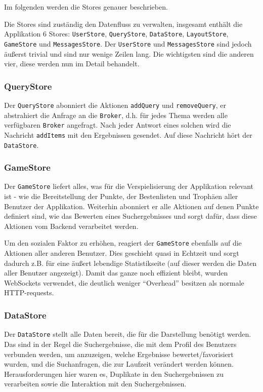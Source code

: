 \documentclass[12pt,twoside]{book}
\begin{document}
Im folgenden werden die Stores genauer beschrieben.

Die Stores sind zuständig den Datenfluss zu verwalten, insgesamt enthält die Applikation 6 Stores: \texttt{UserStore}, \texttt{QueryStore}, \texttt{DataStore}, \texttt{LayoutStore}, \texttt{GameStore} und \texttt{MessagesStore}.
Der \texttt{UserStore} und \texttt{MessagesStore} sind jedoch äußerst trivial und sind nur wenige Zeilen lang. Die wichtigsten sind die anderen vier, diese werden nun im Detail behandelt.

\subsubsection*{QueryStore}

Der \texttt{QueryStore} abonniert die Aktionen \texttt{addQuery} und \texttt{removeQuery}, er abstrahiert die Anfrage an die \texttt{Broker}, d.h. für jedes Thema werden alle verfügbaren \texttt{Broker} angefragt. Nach jeder Antwort eines solchen wird die Nachricht \texttt{addItems} mit den Ergebnissen gesendet. Auf diese Nachricht hört der \texttt{DataStore}.

\subsubsection*{GameStore}

Der \texttt{GameStore} liefert alles, was für die Verspielisierung der Applikation relevant ist - wie die Bereitstellung der Punkte, der Bestenlisten und Trophäen aller Benutzer der Applikation. Weiterhin abonniert er alle Aktionen auf denen Punkte definiert sind, wie das Bewerten eines Suchergebnisses und sorgt dafür, dass diese Aktionen vom Backend verarbeitet werden.

Um den sozialen Faktor zu erhöhen, reagiert der \texttt{GameStore} ebenfalls auf die Aktionen aller anderen Benutzer. Dies geschieht quasi in Echtzeit und sorgt dadurch z.B. für eine äußert lebendige Statistikseite (auf dieser werden die Daten aller Benutzer angezeigt).
Damit das ganze noch effizient bleibt, wurden WebSockets verwendet, die deutlich weniger ``Overhead'' besitzen als normale HTTP-requests.

\subsubsection*{DataStore}

Der \texttt{DataStore} stellt alle Daten bereit, die für die Darstellung benötigt werden. Das sind in der Regel die Suchergebnisse, die mit dem Profil des Benutzers verbunden werden, um anzuzeigen, welche Ergebnisse bewertet/favorisiert wurden, und die Suchanfragen, die zur Laufzeit verändert werden können. Herausforderungen hier waren es, Duplikate in den Suchergebnissen zu verarbeiten sowie die Interaktion mit den Suchergebnissen.
\end{document}
